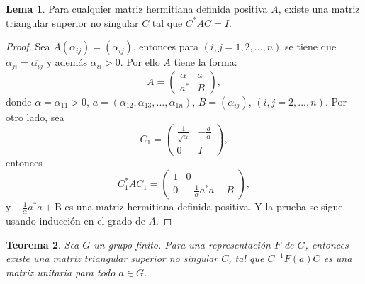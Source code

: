 \documentclass[12pt]{book}
\newtheorem{theorem}{Teorema}[section]
\theoremstyle{definition}
\newtheorem{lemma}[theorem]{Lema}
\newcounter{in}
\newcounter{ini}
\begin{document}
\begin{lemma}
  \label{l2_2}
  Para cualquier matriz hermitiana definida positiva $A$, existe una
  matriz triangular superior no singular $C$ tal que
  $C^{*}AC=I$.
\end{lemma}

\begin{proof}
  Sea $A\left(\alpha_{ij}\right)=(\alpha_{ij})$, entonces para
  $\left(i,j=1,2,...,n\right)$ se tiene que
  $\alpha_{ji}=\overline{\alpha_{ij}}$ y además
  $\alpha_{ii}>0$. Por ello $A$ tiene la forma:
  \begin{equation}
    \label{eq:2}
     A=
     \begin{pmatrix}
    \alpha & a \\ 
    a^{*} & B
  \end{pmatrix},
  \end{equation} 
  donde $\alpha=\alpha_{11}>0$,
  $ a= \left(\alpha_{12},\alpha_{13},...,\alpha_{1n} \right) $,
  $ B=\left(\alpha_{ij}\right)$,
  $ \left(i,j=2,...,n\right) $. Por otro lado, sea
\begin{equation}
  \label{eq:3}
  C_{1}=
  \begin{pmatrix}
    \frac{1}{\sqrt{\alpha}} & -\frac{a}{\alpha} \\ 
    0 & I
  \end{pmatrix},
\end{equation}
entonces 
\begin{equation}
   \label{eq:4}
  C_{1}^{*}AC_{1} =
  \begin{pmatrix}
    1 & 0 \\ 
    0 & -\frac{1}{\alpha}a^{*}a+B
  \end{pmatrix},
\end{equation}  
y $-\frac{1}{\alpha}a^{*}a+\mathrm{B}$ es una matriz hermitiana
definida positiva. Y la prueba se sigue usando inducción en el grado de $A$.
\end{proof}

\begin{theorem}
  \label{t2_3}
  Sea $G$ un grupo finito. Para una representación $F$ de $G$,
  entonces existe una matriz triangular superior no singular $C$,
  tal que $C^{-1}F\left(a\right)C$ es una matriz unitaria para todo
  $a \in G$.
\end{theorem}
\end{document}
